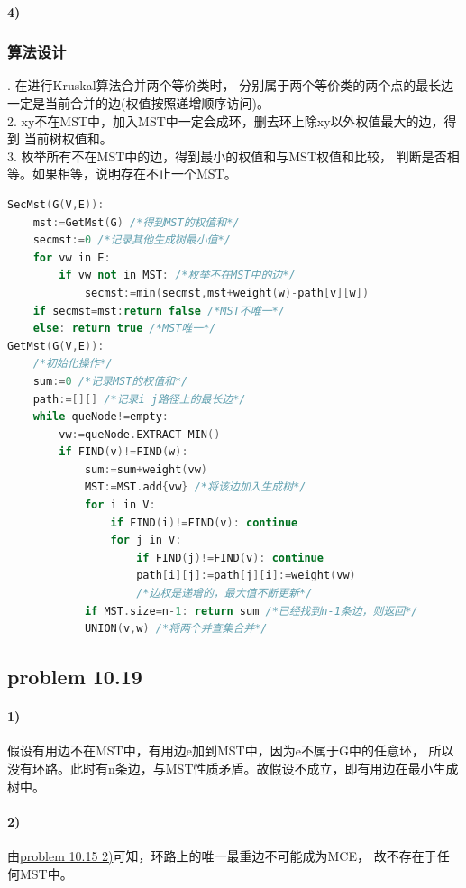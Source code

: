 \documentclass[11pt,a4paper,oneside,oldfontcommands]{ctexart}
\begin{document}
\paragraph*{4)}
\subsubsection*{算法设计}
. 在进行Kruskal算法合并两个等价类时，
分别属于两个等价类的两个点的最长边一定是当前合并的边(权值按照递增顺序访问)。\\
2. xy不在MST中，加入MST中一定会成环，删去环上除xy以外权值最大的边，得到
当前树权值和。\\
3. 枚举所有不在MST中的边，得到最小的权值和与MST权值和比较，
判断是否相等。如果相等，说明存在不止一个MST。
\begin{lstlisting}[language=C++,title=SecMst.func]
SecMst(G(V,E)):
	mst:=GetMst(G) /*得到MST的权值和*/
	secmst:=0 /*记录其他生成树最小值*/
	for vw in E:
		if vw not in MST: /*枚举不在MST中的边*/
			secmst:=min(secmst,mst+weight(w)-path[v][w])
	if secmst=mst:return false /*MST不唯一*/
	else: return true /*MST唯一*/
GetMst(G(V,E)):
	/*初始化操作*/
	sum:=0 /*记录MST的权值和*/
	path:=[][] /*记录i j路径上的最长边*/
	while queNode!=empty:
		vw:=queNode.EXTRACT-MIN()
		if FIND(v)!=FIND(w):
			sum:=sum+weight(vw)
			MST:=MST.add{vw} /*将该边加入生成树*/
			for i in V:
				if FIND(i)!=FIND(v): continue
				for j in V:
					if FIND(j)!=FIND(v): continue
					path[i][j]:=path[j][i]:=weight(vw) 
					/*边权是递增的，最大值不断更新*/
			if MST.size=n-1: return sum /*已经找到n-1条边，则返回*/
			UNION(v,w) /*将两个并查集合并*/
\end{lstlisting}
{\subsection*{problem 10.19}}
\paragraph*{1)}
假设有用边不在MST中，有用边e加到MST中，因为e不属于G中的任意环，
所以没有环路。此时有n条边，与MST性质矛盾。故假设不成立，即有用边在最小生成树中。
\paragraph*{2)}
由\hyperlink{problem101502}{problem 10.15 2)}可知，环路上的唯一最重边不可能成为MCE，
故不存在于任何MST中。
\end{document}

